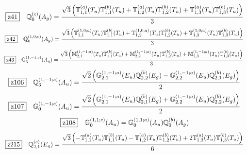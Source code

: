 \documentclass[fleqn,10pt,landscape]{jsarticle}
\begin{document}
\begin{dmath*}
\hspace*{3mm}\fbox{z41}\quad \mathbb{Q}_{0}^{(c)}(A_{g})=\frac{\sqrt{3} \left(\mathbb{T}_{1,1}^{(a)}(T_{u}) \mathbb{T}_{1,1}^{(b)}(T_{u}) + \mathbb{T}_{1,2}^{(a)}(T_{u}) \mathbb{T}_{1,2}^{(b)}(T_{u}) + \mathbb{T}_{1,3}^{(a)}(T_{u}) \mathbb{T}_{1,3}^{(b)}(T_{u})\right)}{3}
\end{dmath*}
\begin{dmath*}
\hspace*{3mm}\fbox{z42}\quad \mathbb{Q}_{0}^{(1,0;c)}(A_{g})=\frac{\sqrt{3} \left(\mathbb{T}_{1,1}^{(1,0;a)}(T_{u}) \mathbb{T}_{1,1}^{(b)}(T_{u}) + \mathbb{T}_{1,2}^{(1,0;a)}(T_{u}) \mathbb{T}_{1,2}^{(b)}(T_{u}) + \mathbb{T}_{1,3}^{(1,0;a)}(T_{u}) \mathbb{T}_{1,3}^{(b)}(T_{u})\right)}{3}
\end{dmath*}
\begin{dmath*}
\hspace*{3mm}\fbox{z43}\quad \mathbb{G}_{3}^{(1,-1;c)}(A_{g})=\frac{\sqrt{3} \left(\mathbb{M}_{2,1}^{(1,-1;a)}(T_{u}) \mathbb{T}_{1,1}^{(b)}(T_{u}) + \mathbb{M}_{2,2}^{(1,-1;a)}(T_{u}) \mathbb{T}_{1,2}^{(b)}(T_{u}) + \mathbb{M}_{2,3}^{(1,-1;a)}(T_{u}) \mathbb{T}_{1,3}^{(b)}(T_{u})\right)}{3}
\end{dmath*}
\begin{dmath*}
\hspace*{3mm}\fbox{z106}\quad \mathbb{Q}_{3}^{(1,-1;c)}(A_{u})=\frac{\sqrt{2} \left(\mathbb{G}_{2,1}^{(1,-1;a)}(E_{u}) \mathbb{Q}_{2,2}^{(b)}(E_{g}) - \mathbb{G}_{2,2}^{(1,-1;a)}(E_{u}) \mathbb{Q}_{2,1}^{(b)}(E_{g})\right)}{2}
\end{dmath*}
\begin{dmath*}
\hspace*{3mm}\fbox{z107}\quad \mathbb{G}_{0}^{(1,-1;c)}(A_{u})=\frac{\sqrt{2} \left(\mathbb{G}_{2,1}^{(1,-1;a)}(E_{u}) \mathbb{Q}_{2,1}^{(b)}(E_{g}) + \mathbb{G}_{2,2}^{(1,-1;a)}(E_{u}) \mathbb{Q}_{2,2}^{(b)}(E_{g})\right)}{2}
\end{dmath*}
\begin{dmath*}
\hspace*{3mm}\fbox{z108}\quad \mathbb{G}_{0}^{(1,1;c)}(A_{u})=\mathbb{G}_{0}^{(1,1;a)}(A_{u}) \mathbb{Q}_{0}^{(b)}(A_{g})
\end{dmath*}
\begin{dmath*}
\hspace*{3mm}\fbox{z215}\quad \mathbb{Q}_{2,1}^{(c)}(E_{g})=\frac{\sqrt{3} \left(- \mathbb{T}_{1,1}^{(a)}(T_{u}) \mathbb{T}_{1,1}^{(b)}(T_{u}) - \mathbb{T}_{1,2}^{(a)}(T_{u}) \mathbb{T}_{1,2}^{(b)}(T_{u}) + 2 \mathbb{T}_{1,3}^{(a)}(T_{u}) \mathbb{T}_{1,3}^{(b)}(T_{u})\right)}{6}
\end{dmath*}
\end{document}
